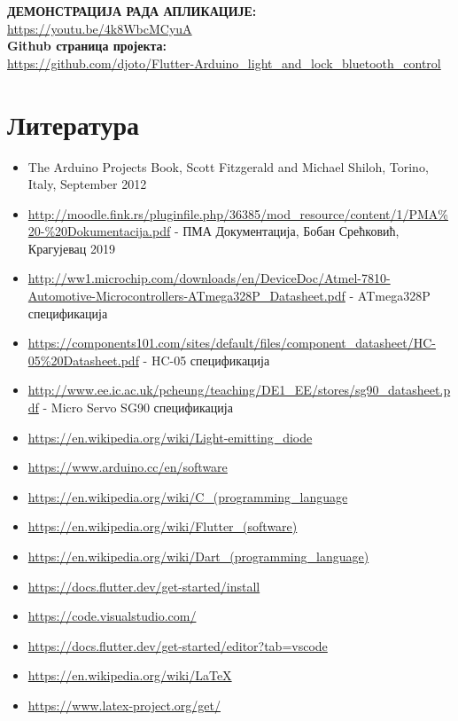 \documentclass[12pt]{article}
\begin{document}
\vspace{1cm}
\indent\textbf{ДЕМОНСТРАЦИЈА РАДА АПЛИКАЦИЈЕ:}\\ \indent\url{https://youtu.be/4k8WbcMCyuA}
\vspace{0.5cm}\\
\indent\textbf{Github страница пројекта:}\\
\indent\url{https://github.com/djoto/Flutter-Arduino_light_and_lock_bluetooth_control}

\newpage
\section{Литература}
\begin{itemize}
  \item The Arduino Projects Book, Scott Fitzgerald and Michael Shiloh,  Torino, Italy, September 2012
  \item \url{http://moodle.fink.rs/pluginfile.php/36385/mod\_resource/content/1/PMA\%20-\%20Dokumentacija.pdf} - ПМА Документација, Бобан Срећковић, Крагујевац 2019
  \item \url{http://ww1.microchip.com/downloads/en/DeviceDoc/Atmel-7810-Automotive-Microcontrollers-ATmega328P\_Datasheet.pdf} - ATmega328P спецификација
  \item \url{https://components101.com/sites/default/files/component\_datasheet/HC-05\%20Datasheet.pdf} - HC-05 спецификација
  \item \url{http://www.ee.ic.ac.uk/pcheung/teaching/DE1\_EE/stores/sg90\_datasheet.pdf} - Micro Servo SG90 спецификација
  \item \url{https://en.wikipedia.org/wiki/Light-emitting_diode}
  \item \url{https://www.arduino.cc/en/software}
  \item \url{https://en.wikipedia.org/wiki/C\_(programming_language}
  \item \url{https://en.wikipedia.org/wiki/Flutter\_(software)}
  \item \url{https://en.wikipedia.org/wiki/Dart\_(programming\_language)}
  \item \url{https://docs.flutter.dev/get-started/install}
  \item \url{https://code.visualstudio.com/}
  \item \url{https://docs.flutter.dev/get-started/editor?tab=vscode}
  \item \url{https://en.wikipedia.org/wiki/LaTeX}
  \item \url{https://www.latex-project.org/get/}

\end{itemize}
\end{document}
